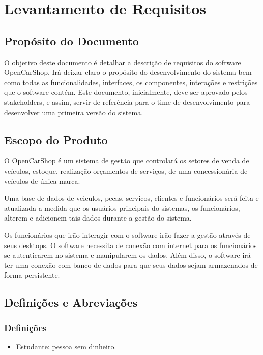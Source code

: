 \section{Levantamento de Requisitos}\label{requisitos}

\subsection{Propósito do Documento}
O objetivo deste documento é detalhar a descrição de requisitos do software OpenCarShop. Irá deixar claro o propósito do desenvolvimento do sistema bem como todas as funcionalidades, interfaces, os componentes, interações e restrições que o software contém. Este documento, inicialmente, deve ser aprovado pelos stakeholders, e assim, servir de referência para o time de desenvolvimento para desenvolver uma primeira versão do sistema.




\subsection{Escopo do Produto}
O OpenCarShop é um sistema de gestão que controlará os setores de venda de veículos, estoque, realização orçamentos de serviços, de uma concessionária de veículos de única marca.
\par 
Uma base de dados de veiculos, pecas, servicos, clientes e funcionários será feita e atualizada a medida que os usuários principais do sistemas, os funcionários, alterem e adicionem tais dados durante a gestão do sistema.
\par
Os funcionários que irão interagir com o software irão fazer a gestão através de seus desktops. O software necessita de conexão com internet para os funcionários se autenticarem no sistema e manipularem os dados. Além disso, o software irá ter uma conexão com banco de dados para que seus dados sejam armazenados de forma persistente.




\subsection{Definições e Abreviações}
	\subsubsection{Definições}
	\begin{itemize}
	\item[] Estudante: pessoa sem dinheiro.
	\end{itemize}

